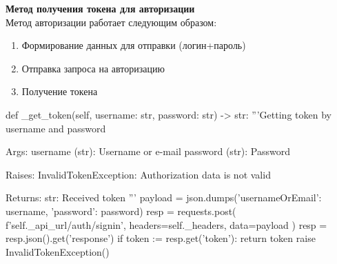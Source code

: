 \documentclass[a4paper,12pt]{article} %
\begin{document}
\textbf{Метод получения токена для авторизации} \\
Метод авторизации работает следующим образом:
\begin{enumerate}
    \item Формирование данных для отправки (логин+пароль)
    \item Отправка запроса на авторизацию
    \item Получение токена
\end{enumerate}
\begin{python}
    def _get_token(self, username: str, password: str) -> str:
        '''Getting token by username and password

        Args:
            username (str): Username or e-mail
            password (str): Password

        Raises:
            InvalidTokenException: Authorization data is not valid

        Returns:
            str: Received token
        '''
        payload = json.dumps({'usernameOrEmail': username, 'password': password})
        resp = requests.post(
            f'{self._api_url}/auth/signin', headers=self._headers, data=payload
        )
        resp = resp.json().get('response')
        if token := resp.get('token'):
            return token
        raise InvalidTokenException()
\end{python}
\end{document}
